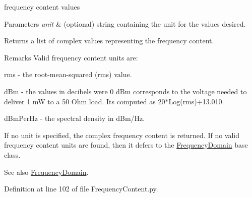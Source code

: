 frequency content values 


\begin{DoxyParams}{Parameters}
{\em unit} & (optional) string containing the unit for the values desired. \\
\hline
\end{DoxyParams}
\begin{DoxyReturn}{Returns}
a list of complex values representing the frequency content. 
\end{DoxyReturn}
\begin{DoxyRemark}{Remarks}
Valid frequency content units are\+:~\newline

\begin{DoxyItemize}
\item \textquotesingle{}rms\textquotesingle{} -\/ the root-\/mean-\/squared (rms) value.
\item \textquotesingle{}d\+Bm\textquotesingle{} -\/ the values in decibels were 0 d\+Bm corresponds to the voltage needed to deliver 1 mW to a 50 Ohm load. It\textquotesingle{}s computed as 20$\ast$\+Log(rms)+13.010.
\item \textquotesingle{}d\+Bm\+Per\+Hz\textquotesingle{} -\/ the spectral density in d\+Bm/\+Hz.
\end{DoxyItemize}
\end{DoxyRemark}
If no unit is specified, the complex frequency content is returned. If no valid frequency content units are found, then it defers to the \hyperlink{namespaceSignalIntegrity_1_1FrequencyDomain_1_1FrequencyDomain}{Frequency\+Domain} base class.

\begin{DoxySeeAlso}{See also}
\hyperlink{namespaceSignalIntegrity_1_1FrequencyDomain_1_1FrequencyDomain}{Frequency\+Domain}. 
\end{DoxySeeAlso}


Definition at line 102 of file Frequency\+Content.\+py.

\mbox{\label{classSignalIntegrity_1_1FrequencyDomain_1_1FrequencyContent_1_1FrequencyContent_af833a7687c414346de1e2ffab6b47d5c}} 
